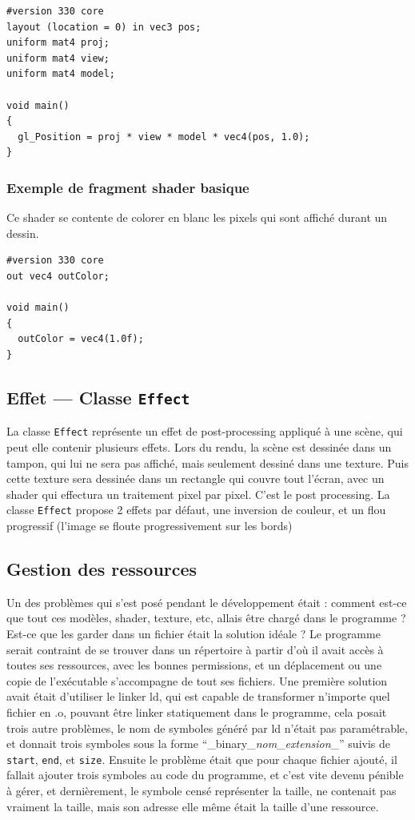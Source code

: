 \documentclass[pdftex, 11pt, a4paper, titlepage]{article}
\begin{document}
\begin{lstlisting}
#version 330 core
layout (location = 0) in vec3 pos;
uniform mat4 proj;
uniform mat4 view;
uniform mat4 model;

void main()
{
  gl_Position = proj * view * model * vec4(pos, 1.0);
}
\end{lstlisting}
\pagebreak
\subsubsection{Exemple de fragment shader basique}
Ce shader se contente de colorer en blanc les pixels qui sont affiché
durant un dessin.

\begin{lstlisting}
#version 330 core
out vec4 outColor;

void main()
{
  outColor = vec4(1.0f);
}
\end{lstlisting}

\subsection{Effet --- Classe \texttt{Effect}}

La classe \texttt{Effect} représente un effet de post-processing appliqué à
une scène, qui peut elle contenir plusieurs effets.
Lors du rendu, la scène est dessinée dans un tampon, qui lui ne sera pas
affiché, mais seulement dessiné dans une texture. Puis cette texture
sera dessinée dans un rectangle qui couvre tout l'écran, avec un shader
qui effectura un traitement pixel par pixel. C'est le post processing.
La classe \texttt{Effect} propose 2 effets par défaut, une inversion de couleur,
et un flou progressif (l'image se floute progressivement sur les bords)

\subsection{Gestion des ressources}

Un des problèmes qui s'est posé pendant le développement était :
comment est-ce que tout ces modèles, shader, texture, etc, allais être
chargé dans le programme ?  Est-ce que les garder dans un fichier
était la solution idéale ? Le programme serait contraint de se
trouver dans un répertoire à partir d'où il avait accès à toutes ses
ressources, avec les bonnes permissions, et un déplacement ou une
copie de l'exécutable s'accompagne de tout ses fichiers.  Une première
solution avait était d'utiliser le linker ld, qui est capable de
transformer n'importe quel fichier en .o, pouvant être linker
statiquement dans le programme, cela posait trois autre problèmes, le
nom de symboles généré par ld n'était pas paramétrable, et donnait
trois symboles sous la forme ``\_binary\_\textit{nom}\_\textit{extension}\_''
 suivis de \texttt{start}, \texttt{end}, et \texttt{size}. Ensuite 
le problème était que pour chaque fichier ajouté, il fallait ajouter
 trois symboles au code du programme, et c'est vite devenu pénible 
à gérer, et dernièrement, le symbole censé représenter la taille, 
ne contenait pas vraiment la taille, mais son adresse elle même 
était la taille d'une ressource.
\end{document}
